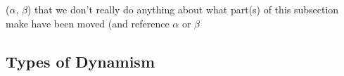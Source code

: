 \documentclass[times]{cpeauth}
\newcommand{\jhanote}[1]{ {\textcolor{blue} { ***Shantenu: #1 }}}
\begin{document}

($\alpha$, $\beta$) that we don't really do anything %
about what part(s) of this subsection make %
have been moved (and reference %
$\alpha$ or $\beta$ %

\subsection{Types of Dynamism \label{sec:dynTypes}}
\end{document}
